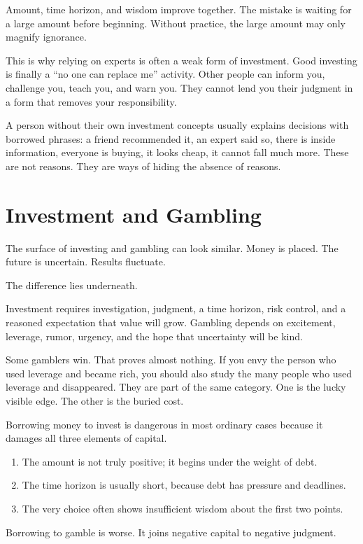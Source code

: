 Amount, time horizon, and wisdom improve together. The mistake is waiting for a large amount before beginning. Without practice, the large amount may only magnify ignorance.

This is why relying on experts is often a weak form of investment. Good investing is finally a ``no one can replace me'' activity. Other people can inform you, challenge you, teach you, and warn you. They cannot lend you their judgment in a form that removes your responsibility.

A person without their own investment concepts usually explains decisions with borrowed phrases: a friend recommended it, an expert said so, there is inside information, everyone is buying, it looks cheap, it cannot fall much more. These are not reasons. They are ways of hiding the absence of reasons.

\section*{Investment and Gambling}

The surface of investing and gambling can look similar. Money is placed. The future is uncertain. Results fluctuate.

The difference lies underneath.

Investment requires investigation, judgment, a time horizon, risk control, and a reasoned expectation that value will grow. Gambling depends on excitement, leverage, rumor, urgency, and the hope that uncertainty will be kind.

Some gamblers win. That proves almost nothing. If you envy the person who used leverage and became rich, you should also study the many people who used leverage and disappeared. They are part of the same category. One is the lucky visible edge. The other is the buried cost.

Borrowing money to invest is dangerous in most ordinary cases because it damages all three elements of capital.

\begin{enumerate}
\item The amount is not truly positive; it begins under the weight of debt.
\item The time horizon is usually short, because debt has pressure and deadlines.
\item The very choice often shows insufficient wisdom about the first two points.
\end{enumerate}

Borrowing to gamble is worse. It joins negative capital to negative judgment.

